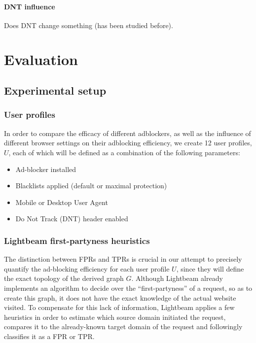 \documentclass{sig-alternate}
\begin{document}
\paragraph{DNT influence}
Does DNT change something (has been studied before).

\section{Evaluation}

\subsection{Experimental setup}

\subsubsection{User profiles}
In order to compare the efficacy of different adblockers, as well as the influence of different browser settings on their adblocking efficiency, we create 12 user profiles, $U$, each of which will be defined as a combination of the following parameters:

\begin{itemize}
 \item Ad-blocker installed
 \item Blacklists applied (default or maximal protection)
 \item Mobile or Desktop User Agent
 \item Do Not Track (DNT) header enabled
\end{itemize}

\subsubsection{Lightbeam first-partyness heuristics}
The distinction between FPRs and TPRs is crucial in our attempt to precisely quantify the ad-blocking efficiency for each user profile $U$, since they will define the exact topology of the derived graph $G$. Although Lightbeam already implements an algorithm to decide over the ``first-partyness'' of a request, so as to create this graph, it does not have the exact knowledge of the actual website visited. To compensate for this lack of information, Lightbeam applies a few heuristics in order to estimate which source domain initiated the request, compares it to the already-known target domain of the request and followingly classifies it as a FPR or TPR.
\end{document}
